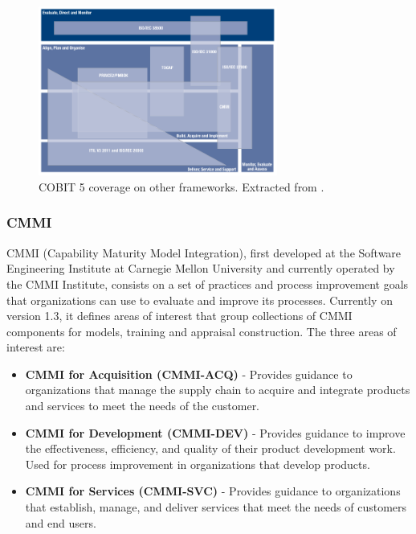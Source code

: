 \begin{figure}[h!]
\centering
\includegraphics[width=0.7\textwidth]{img/COBITOtherFrameworks.png}
\caption{COBIT 5 coverage on other frameworks. Extracted from \cite{2012cobit}.}
\end{figure}


\subsubsection{CMMI}


CMMI (Capability Maturity Model Integration), first developed at the Software Engineering Institute at Carnegie Mellon University and currently operated by the CMMI Institute, consists on a set of practices and process improvement goals that organizations can use to evaluate and improve its processes. Currently on version 1.3, it defines areas of interest that group collections of CMMI components for models, training and appraisal construction. The three areas of interest are:

\begin{itemize}

\item \textbf{CMMI for Acquisition (CMMI-ACQ)\cite{cmmiAcquisition}} - Provides guidance to organizations that manage the supply chain to acquire and integrate products and services to meet the needs of the customer.

\item \textbf{CMMI for Development (CMMI-DEV)\cite{cmmi}} - Provides guidance to improve the effectiveness, efficiency, and quality of their product development work. Used for process improvement in organizations that develop products.

\item \textbf{CMMI for Services (CMMI-SVC)\cite{cmmiServices}} - Provides guidance to organizations that establish, manage, and deliver services that meet the needs of customers and end users.

\end{itemize}

